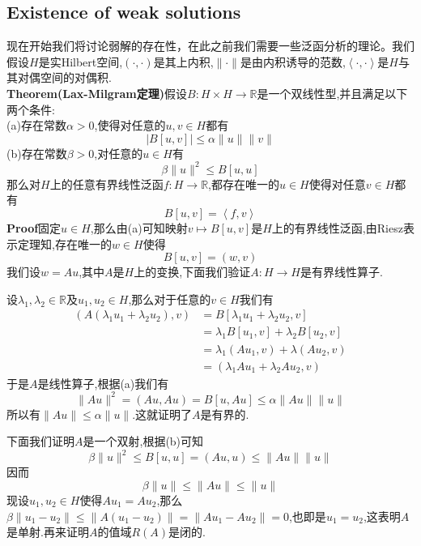 \documentclass[a4paper,UTF8,12pt]{ctexart}
\begin{document}
\subsection{Existence of weak solutions}
现在开始我们将讨论弱解的存在性，在此之前我们需要一些泛函分析的理论。我们假设$H$是实Hilbert空间,$(\cdot,\cdot)$是其上内积,$\|\cdot\|$是由内积诱导的范数,$\left\langle \cdot,\cdot\right\rangle $是$H$与其对偶空间的对偶积.\\
\textbf{Theorem(Lax-Milgram定理)}\quad 假设$B:H\times H\to \mathbb{R}$是一个双线性型,并且满足以下两个条件:\\
(a)存在常数$\alpha>0$,使得对任意的$u,v\in H$都有
\begin{equation}
    |B[u,v]|\leqslant \alpha\|u\|\|v\|
\end{equation}
(b)存在常数$\beta>0$,对任意的$u\in H$有
\begin{equation}
    \beta\|u\|^2\leqslant B[u,u]
\end{equation}
那么对$H$上的任意有界线性泛函$f:H\to \mathbb{R}$,都存在唯一的$u\in H$使得对任意$v\in H$都有
\begin{equation}
    B[u,v]=\left\langle f,v \right\rangle 
\end{equation}
\textbf{Proof}\quad 固定$u\in H$,那么由(a)可知映射$v\mapsto B[u,v]$是$H$上的有界线性泛函,由Riesz表示定理知,存在唯一的$w\in H$使得
$$
B[u,v] = (w,v)
$$
我们设$w=Au$,其中$A$是$H$上的变换,下面我们验证$A:H\to H$是有界线性算子.\par
设$\lambda_1,\lambda_2\in\mathbb{R}$及$u_1,u_2\in H$,那么对于任意的$v\in H$我们有
$$
\begin{aligned}
    (A(\lambda_1u_1+\lambda_2u_2),v) &= B[\lambda_1u_1+\lambda_2u_2,v]\\
                                     &= \lambda_1B[u_1,v]+\lambda_2 B[u_2,v]\\
                                     &= \lambda_1 (Au_1,v)+\lambda (Au_2,v)\\
                                     &= (\lambda_1Au_1+\lambda_2Au_2,v)
\end{aligned}
$$
于是$A$是线性算子,根据(a)我们有
$$
\|Au\|^2=(Au,Au)=B[u,Au]\leqslant \alpha \|Au\|\|u\|
$$
所以有$\|Au\|\leqslant \alpha\|u\|$.这就证明了$A$是有界的.\par
下面我们证明$A$是一个双射,根据(b)可知
$$
\beta\|u\|^2\leqslant B[u,u]=(Au,u)\leqslant \|Au\|\|u\|
$$
因而
$$
\beta\|u\|\leqslant \|Au\|\leqslant\|u\|
$$
现设$u_1,u_2\in H$使得$Au_1=Au_2$,那么$\beta\|u_1-u_2\|\leqslant \|A(u_1-u_2)\|=\|Au_1-Au_2\|=0$,也即是$u_1=u_2$,这表明$A$是单射.再来证明$A$的值域$R(A)$是闭的.
\end{document}
